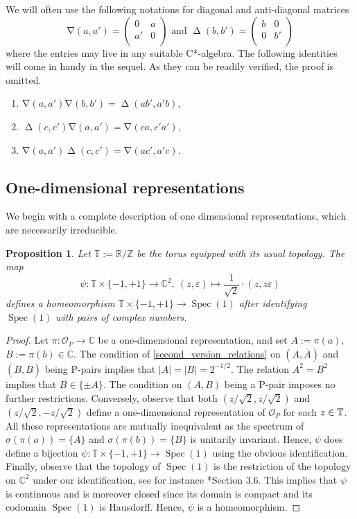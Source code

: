 \documentclass[12pt, a4paper]{amsart}
\def\antidiag{\operatorname{antidiag}}
\def\antidiag{\operatorname{\nabla}}
\def\diag{\operatorname{\Delta}}
\def\Spec{\operatorname{Spec}}
\def\C{\mathbb{C}}
\def\R{\mathbb{R}}
\def\Z{\mathbb{Z}}
\def\T{\mathbb{T}}
\newcommand{\IC}[0]{\mathbb{C}} \newcommand{\ID}[0]{\mathbb{D}}
\newcommand{\CO}[0]{\mathcal{O}} \newcommand{\CP}[0]{\mathcal{P}}
\newtheorem{proposition}[theorem]{Proposition}
\numberwithin{equation}{section}
\begin{document}
We will often use the following notations for diagonal and anti-diagonal matrices
$$
\antidiag(a, a') = \left(\begin{array}{cc}
0& a\\
a' & 0 \\
\end{array}\right)\text{ and }
\diag(b, b') = \left(\begin{array}{cc}
b & 0\\
0 & b' \\
\end{array}\right)
$$
where the entries may live in any suitable C*-algebra.
The following identities   will come in handy in the sequel.
As they can be readily 
verified, the proof is omitted.
\begin{enumerate}
\item $\antidiag(a,a')\antidiag(b,b')=\diag(ab',a'b)$,
\item $\diag(c,c')\antidiag(a,a')=\antidiag(ca,c'a')$,
\item $\antidiag(a,a')\diag(c,c')=\antidiag(ac',a'c).$
\end{enumerate}

\subsection{One-dimensional representations}

We begin with a complete description of one dimensional representations, which are necessarily irreducible.

\begin{proposition}
Let $\T:=\R/\Z$ be the torus equipped with its usual topology.
The map 
$$\psi:\T\times \{-1,+1\}\to \C^2, \ (z,\varepsilon)\mapsto \dfrac{1}{\sqrt 2}\cdot (z,z\varepsilon)$$
defines a homeomorphism $\T\times \{-1,+1\}\to \Spec(1)$ after identifying $\Spec(1)$ with pairs of complex numbers.
\end{proposition}

\begin{proof} 
Let $\pi: \CO_P\to \IC$ be a one-dimensional representation, and set
$A:=\pi(a)$, $B:=\pi(b)\in\IC$. 
The condition of \eqref{second_version_relations} 
on $(A,\overline{A})$ and $(B, \overline{B})$ 
being P-pairs 
implies that $|A|=|B|=2^{-1/2}$.
The relation $A^2=B^2$ implies that $B\in \{\pm A\}$.
The condition on $(A, B)$ being a P-pair
imposes no further restrictions.
Conversely, observe that both $(z/\sqrt 2, z/\sqrt 2)$ and $(z/\sqrt 2,-z/\sqrt 2)$ define a one-dimensional representation of $\mathcal O_P$ for each $z\in \mathbb{T}$.
All these representations are mutually inequivalent as the spectrum of
$\sigma(\pi(a))=\{A\}$ and $\sigma(\pi(b))=\{B\}$ is unitarily invariant.
Hence, $\psi$ does define a bijection $\psi:\T\times\{-1,+1\}\to \Spec(1)$ using the obvious identification.
Finally, observe that the topology of $\Spec(1)$ is the restriction of the topology on $\IC^2$ under our identification, see for instance \cite{Dixmier}*{Section 3.6}.
This implies that $\psi$ is continuous and is moreover closed since its domain is compact and its codomain $\Spec(1)$ is Hausdorff. 
Hence, $\psi$ is a homeomorphism.
\end{proof}
\end{document}
